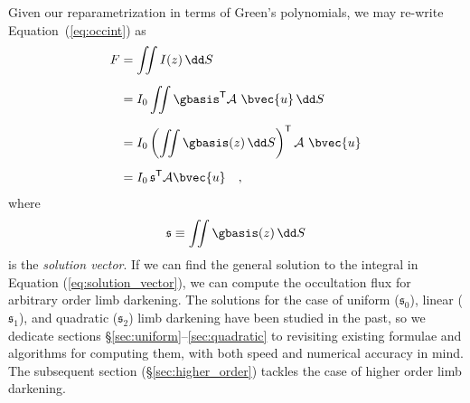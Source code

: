 \documentclass[modern,trackchanges]{aastex63}
\begin{document}
Given our reparametrization in terms of Green's polynomials, we may
re-write Equation~(\ref{eq:occint}) as
%
\begin{align}
    \label{eq:occint_greens}
    F &= \iint I(z) \, \dd S \nonumber \\[0.5em]
      &= I_0 \iint \gbasis^\mathsf{T} \mathcal{A} \ \bvec{u} \, \dd S \,  \nonumber \\[0.5em]
      &= I_0 \left( \iint \gbasis (z) \, \dd S \right)^\mathsf{T} \mathcal{A} \ \bvec{u} \nonumber \\[0.5em]
      &= I_0 \, \mathfrak{s}^\mathsf{T} \mathcal{A} \bvec{u} \quad ,
\end{align}
%
where
%
\begin{align}
    \label{eq:solution_vector}
    \mathfrak{s} \equiv \iint \gbasis (z) \, \dd S
\end{align}
%
is the \emph{solution vector}.
If we can find the general solution to the integral in Equation (\ref{eq:solution_vector}),
we can compute the occultation flux for arbitrary order limb darkening.
The solutions for the case of uniform ($\mathfrak{s}_0$), linear ($\mathfrak{s}_1$),
and quadratic ($\mathfrak{s}_2$) limb darkening have been studied in
the past, so we dedicate sections \S\ref{sec:uniform}--\ref{sec:quadratic}
to revisiting existing formulae and algorithms for computing them, with both speed and numerical accuracy
in mind. The subsequent section (\S\ref{sec:higher_order}) tackles the case of higher order
limb darkening.
\end{document}
